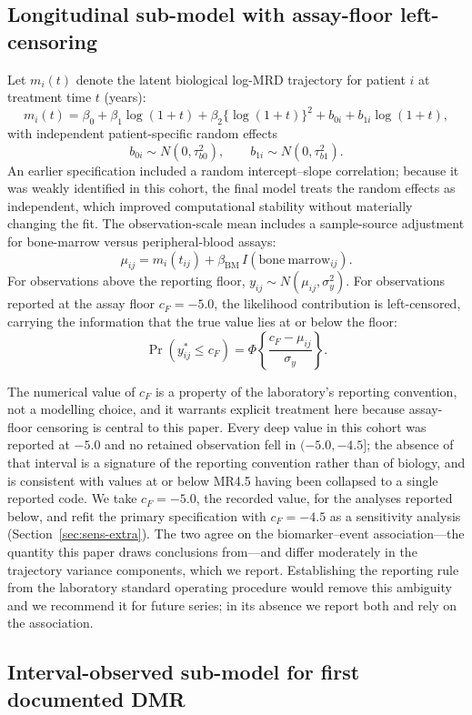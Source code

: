 \documentclass[11pt]{article}
\begin{document}
\subsection{Longitudinal sub-model with assay-floor left-censoring}
\label{sec:long}

Let $m_i(t)$ denote the latent biological log-MRD trajectory for patient
$i$ at treatment time $t$ (years):
\[
m_i(t)=\beta_0+\beta_1\log(1+t)+\beta_2\{\log(1+t)\}^2
+b_{0i}+b_{1i}\log(1+t),
\]
with independent patient-specific random effects
\[
b_{0i}\sim N(0,\tau_{b0}^2), \qquad b_{1i}\sim N(0,\tau_{b1}^2).
\]
An earlier specification included a random intercept--slope correlation;
because it was weakly identified in this cohort, the final model treats the
random effects as independent, which improved computational stability
without materially changing the fit. The observation-scale mean includes a
sample-source adjustment for bone-marrow versus peripheral-blood assays:
\[
\mu_{ij}=m_i(t_{ij})+\beta_{\mathrm{BM}}\,I(\mathrm{bone\ marrow}_{ij}).
\]
For observations above the reporting floor,
$y_{ij}\sim N(\mu_{ij},\sigma_y^2)$. For observations reported at the
assay floor $c_F=-5.0$, the likelihood contribution is left-censored,
carrying the information that the true value lies at or below the floor:
\[
\Pr(y_{ij}^{\ast}\le c_F)=
\Phi\!\left\{\frac{c_F-\mu_{ij}}{\sigma_y}\right\}.
\]

The numerical value of $c_F$ is a property of the laboratory's reporting
convention, not a modelling choice, and it warrants explicit treatment here
because assay-floor censoring is central to this paper. Every deep value in this
cohort was reported at $-5.0$ and no retained observation fell in
$(-5.0,-4.5]$; the absence of that interval is a signature of the reporting
convention rather than of biology, and is consistent with values at or below
MR4.5 having been collapsed to a single reported code. We take $c_F=-5.0$, the
recorded value, for the analyses reported below, and refit the primary
specification with $c_F=-4.5$ as a sensitivity analysis
(Section~\ref{sec:sens-extra}). The two agree on the biomarker--event
association---the quantity this paper draws conclusions from---and differ
moderately in the trajectory variance components, which we report. Establishing
the reporting rule from the laboratory standard operating procedure would remove
this ambiguity and we recommend it for future series; in its absence we report
both and rely on the association.

\subsection{Interval-observed sub-model for first documented DMR}
\label{sec:interval}
\end{document}
